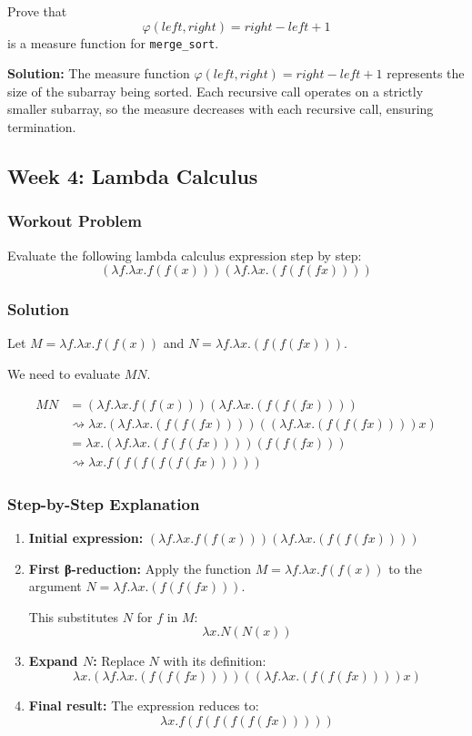 \documentclass{article}
\theoremstyle{plain}
\theoremstyle{definition}
\theoremstyle{remark}
\begin{document}
Prove that
\[
    \varphi(left, right) = right - left + 1
\]
is a measure function for \texttt{merge\_sort}.

\textbf{Solution:} The measure function $\varphi(left, right) = right - left + 1$ represents the size of the subarray being sorted. Each recursive call operates on a strictly smaller subarray, so the measure decreases with each recursive call, ensuring termination.

\subsection{Week 4: Lambda Calculus}

\subsubsection{Workout Problem}

Evaluate the following lambda calculus expression step by step:
$$(\lambda f.\lambda x.f(f(x))) (\lambda f.\lambda x.(f(f(f x))))$$

\subsubsection{Solution}

Let $M = \lambda f.\lambda x.f(f(x))$ and $N = \lambda f.\lambda x.(f(f(f x)))$.

We need to evaluate $M N$.

\begin{align}
M N &= (\lambda f.\lambda x.f(f(x))) (\lambda f.\lambda x.(f(f(f x)))) \\
&\rightsquigarrow \lambda x. (\lambda f.\lambda x.(f(f(f x)))) ((\lambda f.\lambda x.(f(f(f x)))) x) \\
&= \lambda x. (\lambda f.\lambda x.(f(f(f x)))) (f(f(f x))) \\
&\rightsquigarrow \lambda x. f(f(f(f(f(f x)))))
\end{align}

\subsubsection{Step-by-Step Explanation}

\begin{enumerate}
    \item \textbf{Initial expression:} $(\lambda f.\lambda x.f(f(x))) (\lambda f.\lambda x.(f(f(f x))))$
    
    \item \textbf{First β-reduction:} Apply the function $M = \lambda f.\lambda x.f(f(x))$ to the argument $N = \lambda f.\lambda x.(f(f(f x)))$.
    
    This substitutes $N$ for $f$ in $M$:
    $$\lambda x. N(N(x))$$
    
    \item \textbf{Expand $N$:} Replace $N$ with its definition:
    $$\lambda x. (\lambda f.\lambda x.(f(f(f x)))) ((\lambda f.\lambda x.(f(f(f x)))) x)$$
    
    \item \textbf{Final result:} The expression reduces to:
    $$\lambda x. f(f(f(f(f(f x)))))$$
\end{enumerate}
\end{document}
